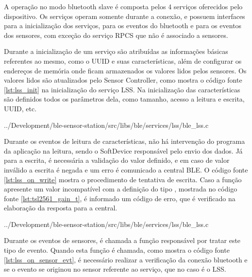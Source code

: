 
A operação no modo bluetooth slave é composta pelos 4 serviços oferecidos pelo
dispositivo. Os serviços operam somente durante a conexão, e possuem interfaces
para a inicialização dos serviços, para os eventos do bluetooth e para os
eventos dos sensores, com exceção do serviço RPCS que não é associado a
sensores.

Durante a inicialização de um serviço são atribuídas as informações básicas
referentes ao mesmo, como o UUID e suas características, além de configurar os
endereços de memória onde ficam armazenados os valores lidos pelos sensores. Os
valores lidos são atualizados pelo Sensor Controller, como mostra o código fonte
\ref{lst:lss_init} na inicialização do serviço LSS. Na inicialização das
características são definidos todos os parâmetros dela, como tamanho, acesso a
leitura e escrita, UUID, etc.

\begin{minipage}{0.95\linewidth} 
 
{../Development/ble-sensor-station/src/libs/ble/services/lss/ble_lss.c}
\end{minipage}

Durante os eventos de leitura de características, não há intervenção do programa
da aplicação na leitura, sendo o SoftDevice responsável pelo envio dos dados. Já
para a escrita, é necessária a validação do valor definido, e em caso de valor
inválido a escrita é negada e um erro é comunicado a central BLE. O código fonte
\ref{lst:lss_on_write} mostra o procedimento de tentativa de escrita. Caso a
função  apresente um valor incompatível
com a definição do tipo , mostrada no código fonte
\ref{lst:tsl2561_gain_t}, é informado um código de erro, que é verificado na
elaboração da resposta para a central.

\begin{minipage}{0.95\linewidth}  
 
{../Development/ble-sensor-station/src/libs/ble/services/lss/ble_lss.c}
\end{minipage}

Durante os eventos de sensores, é chamada a função responsável por
tratar este tipo de evento. Quando esta função é chamada, como mostra o código
fonte \ref{lst:lss_on_sensor_evt}, é necessário realizar a verificação da
conexão bluetooth e se o evento se originou no sensor referente ao serviço, que
no caso é o LSS.

